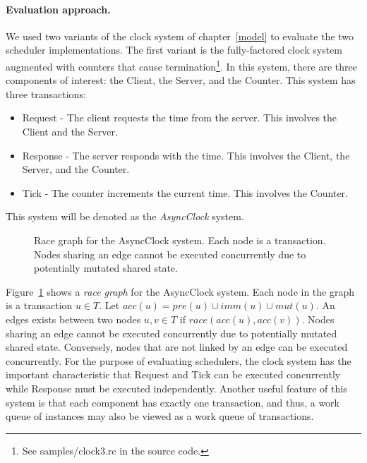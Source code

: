 \paragraph{Evaluation approach.}
We used two variants of the clock system of chapter~\ref{model} to evaluate the two scheduler implementations.
The first variant is the fully-factored clock system augmented with counters that cause termination\footnote{See samples/clock3.rc in the source code.}.
In this system, there are three components of interest:  the Client, the Server, and the Counter.
This system has three transactions:
\begin{itemize}
  \item Request - The client requests the time from the server.  This involves the Client and the Server.
  \item Response - The server responds with the time.  This involves the Client, the Server, and the Counter.
  \item Tick - The counter increments the current time.  This involves the Counter.
\end{itemize}
This system will be denoted as the \emph{AsyncClock} system.

\begin{figure}
\centering
{}%
\caption{Race graph for the AsyncClock system.  Each node is a transaction.  Nodes sharing an edge cannot be executed concurrently due to potentially mutated shared state. \label{clock_system_mutex}}
\end{figure}

Figure~\ref{clock_system_mutex} shows a \emph{race graph} for the AsyncClock system.
Each node in the graph is a transaction $u \in T$.
Let $\mathit{acc}(u) = \mathit{pre}(u) \cup \mathit{imm}(u) \cup \mathit{mut}(u)$.
An edges exists between two nodes $u,v \in T$ if $\mathit{race}(\mathit{acc}(u), \mathit{acc}(v))$.
Nodes sharing an edge cannot be executed concurrently due to potentially mutated shared state.
Conversely, nodes that are not linked by an edge can be executed concurrently.
For the purpose of evaluating schedulers, the clock system has the important characteristic that Request and Tick can be executed concurrently while Response must be executed independently.
Another useful feature of this system is that each component has exactly one transaction, and thus, a  work queue of instances may also be viewed as a work queue of transactions.

